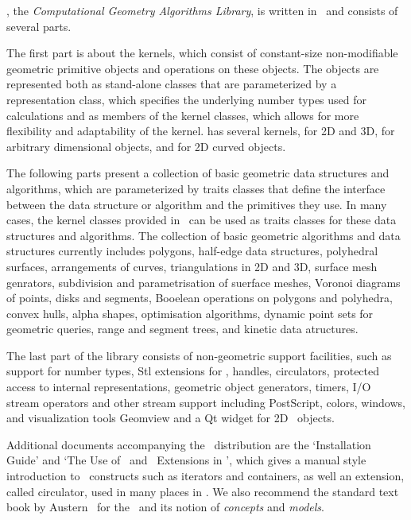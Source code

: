 

\cgal, the {\em Computational Geometry Algorithms Library}, is written in 
\CC\ and consists of several parts.

The first part is about the kernels, which consist of constant-size non-modifiable 
geometric primitive objects and operations on these objects. 
The objects are represented both as stand-alone classes that are
parameterized by a representation class, which specifies
the underlying number types used for calculations and as members of the
kernel classes, which allows for more flexibility and adaptability of the 
kernel.  \cgal has several kernels, for 2D and 3D, for arbitrary dimensional
objects, and for 2D curved objects.

The following parts present a collection of basic geometric data structures and
algorithms, which are parameterized by traits classes that define the 
interface between the data structure or algorithm and the primitives they use.
In many cases, the kernel classes provided in \cgal\ can be used as traits
classes for these data structures and algorithms.
The collection of basic geometric algorithms and data structures
currently includes polygons, half-edge data structures, polyhedral surfaces, 
arrangements of curves, triangulations in 2D and 3D,  surface mesh
genrators, subdivision and parametrisation of suerface meshes,
Voronoi diagrams of points, disks and segments, Booelean operations on polygons and polyhedra,
convex hulls, alpha shapes, optimisation algorithms, dynamic
point sets for geometric queries,  range and segment trees, and 
kinetic data atructures.

The last part of the library consists of non-geometric support
facilities, such as support for number types, {\sc Stl} extensions for
\cgal, handles, circulators, protected access to internal
representations, geometric object generators, timers, I/O stream
operators and other stream support including PostScript, colors,
windows, and visualization tools Geomview and a Qt widget for
2D \cgal\ objects.

Additional documents accompanying the \cgal\ distribution are the
`Installation Guide' and `The Use of \stl\ and \stl\ Extensions in
\cgal', which gives a manual style introduction to \stl\ constructs
such as iterators and containers, as well an extension, called
circulator, used in many places in \cgal. We also recommend the
standard text book by Austern~\cite{cgal:a-gps-98} for the \stl\ and
its notion of \emph{concepts} and \emph{models}.



